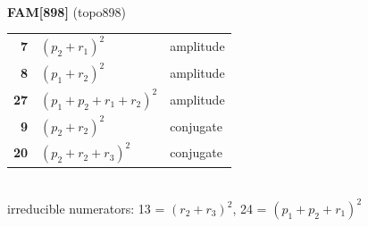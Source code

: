 \documentclass[10pt]{article}
\begin{document}
\begin{minipage}[t]{0.48\textwidth}
{}\\[2mm]\textbf{FAM[898]} (topo898)\\[2pt]{\footnotesize\begin{tabular}{@{}r@{\ \ }l@{\ \ }l@{}}\textbf{7} & $(p_2+r_1)^2$ & amplitude\\
\textbf{8} & $(p_1+r_2)^2$ & amplitude\\
\textbf{27} & $(p_1+p_2+r_1+r_2)^2$ & amplitude\\
\textbf{9} & $(p_2+r_2)^2$ & conjugate\\
\textbf{20} & $(p_2+r_2+r_3)^2$ & conjugate\\\end{tabular}}\\[2pt]{\scriptsize irreducible numerators: 13 = $(r_2+r_3)^2$, 24 = $(p_1+p_2+r_1)^2$}\end{minipage}\hfill%
\end{document}
